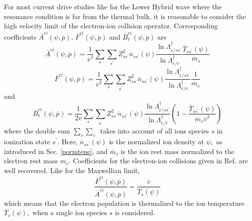 For most current drive studies like for the Lower Hybrid wave where the
resonance condition is far from the thermal bulk, it is reasonable to
consider the high velocity limit of the electron-ion collision operator.
Corresponding coefficients $\overline{A}^{ei}\left( \psi ,\overline{p}%
\right) $, $\overline{F}^{ei}\left( \psi ,\overline{p}\right) $ and $%
\overline{B}_{t}^{ei}\left( \psi ,\overline{p}\right) $ are
\begin{equation}
\overline{A}^{ei}\left( \psi ,\overline{p}\right) =\frac{1}{\overline{v}^{3}}%
\sum_{s}\sum_{s^{\prime }}Z_{ss^{\prime }}^{2}\overline{n}_{ss^{\prime
}}\left( \psi \right) \frac{\ln \Lambda _{e/ss^{\prime }}^{\dagger }}{\ln
\Lambda _{e/e}^{\dagger }}\frac{\overline{T}_{ss^{\prime }}\left( \psi
\right) }{\overline{m}_{s}}
\end{equation}
\begin{equation}
\overline{F}^{ei}\left( \psi ,\overline{p}\right) =\frac{1}{\overline{v}^{2}}%
\sum_{s}\sum_{s^{\prime }}Z_{ss^{\prime }}^{2}\overline{n}_{ss^{\prime
}}\left( \psi \right) \frac{\ln \Lambda _{e/ss^{\prime }}^{\dagger }}{\ln
\Lambda _{e/e}^{\dagger }}\frac{1}{\overline{m}_{s}}
\end{equation}
and
\begin{equation}
\overline{B}_{t}^{ei}\left( \psi ,\overline{p}\right) =\frac{1}{2\overline{v}%
}\sum_{s}\sum_{s^{\prime }}Z_{ss^{\prime }}^{2}\overline{n}_{ss^{\prime
}}\left( \psi \right) \frac{\ln \Lambda _{e/ss^{\prime }}^{\dagger }}{\ln
\Lambda _{e/e}^{\dagger }}\left( 1-\frac{\overline{T}_{ss^{\prime }}\left(
\psi \right) }{\overline{m}_{s}\overline{v}^{2}}\right)   \label{Bthighv}
\end{equation}
where the double sum $\sum_{s}\sum_{s^{\prime }}$ takes into account of all
ions species $s$ in ionization state $s^{\prime }.$ Here, $\overline{n}%
_{ss^{\prime }}\left( \psi \right) $ is the normalized ion density at $\psi ,
$ as introduced in Sec. \ref{normtene}, and $\overline{m}_{s}$ is the ion
rest mass normalized to the electron rest mass $m_{e}$. Coefficients for the
electron-ion collisions given in Ref.\cite{shk97} are well recovered. Like
for the Maxwellian limit,
\begin{equation}
\frac{\overline{F}^{ei}\left( \psi ,\overline{p}\right) }{\overline{A}%
^{ei}\left( \psi ,\overline{p}\right) }=\frac{\overline{v}}{\overline{T}%
_{s}\left( \psi \right) }
\end{equation}
which means that the electron population is thermalized to the ion
temperature $\overline{T}_{s}\left( \psi \right) ,$ when a single ion
species $s$ is considered.

